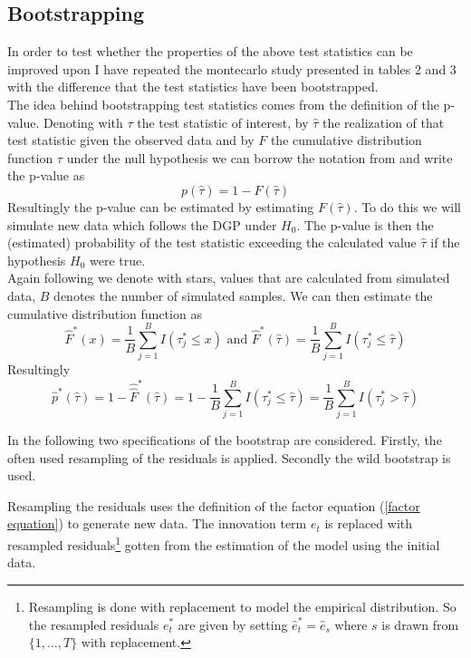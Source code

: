 \documentclass[11pt]{article}
\begin{document}
\subsection{Bootstrapping \citet{breitung2011testing}}
In order to test whether the properties of the above test statistics can be improved upon I have repeated the montecarlo study presented in \citet{breitung2011testing} tables 2 and 3 with the difference that the test statistics have been bootstrapped. \\

The idea behind bootstrapping test statistics comes from the definition of the p-value. Denoting with $\tau$ the test statistic of interest, by $\hat \tau$ the realization of that test statistic given the observed data and by $F$ the cumulative distribution function $\tau$ under the null hypothesis we can borrow the notation from \citet{davidson2004econometric} and write the p-value as
$$p(\hat \tau) = 1 - F(\hat \tau)$$
Resultingly the p-value can be estimated by estimating $F(\hat \tau)$. To do this we will simulate new data which follows the DGP under $H_0$. The p-value is then the (estimated) probability of the test statistic exceeding the calculated value $\hat \tau$ if the hypothesis $H_0$ were true. \\

Again following \citet{davidson2004econometric} we denote with stars, values that are calculated from simulated data, $B$ denotes the number of simulated samples. We can then estimate the cumulative distribution function as 
$$\hat F^*(x) = \frac{1}{B} \sum_{j=1}^B I(\tau^*_j \leq x) \text{ and } \hat F^*(\hat \tau) = \frac{1}{B} \sum_{j=1}^B I(\tau^*_j \leq \hat \tau)$$
Resultingly
$$\hat p^*(\hat \tau) = 1 - \hat \hat F^*(\hat \tau) = 1 - \frac{1}{B} \sum_{j=1}^B I (\tau^*_j \leq \hat \tau) = \frac{1}{B}\sum_{j=1}^B I(\tau^*_j > \hat \tau)$$

In the following two specifications of the bootstrap are considered. Firstly, the often used resampling of the residuals is applied. Secondly the wild bootstrap is used. 

Resampling the residuals uses the definition of the factor equation (\ref{factor equation}) to generate new data. The innovation term $e_t$ is replaced with resampled residuals\footnote{Resampling is done with replacement to model the empirical distribution. So the resampled residuals $e_t^*$ are given by setting $\hat e_t^* = \hat e_s$ where $s$ is drawn from $\{1, ..., T\}$ with replacement.} gotten from the estimation of the model using the initial data.
\end{document}
